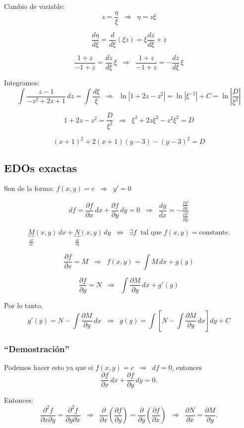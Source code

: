 \documentclass[a4paper,12pt]{article}
\begin{document}
Cambio de variable:
\[
z = \frac{\eta}{\xi} \;\;\Rightarrow\;\; \eta = z\xi
\]

\[
\frac{d\eta}{d\xi} = \frac{d}{d\xi}(\xi z) = \xi \frac{dz}{d\xi} + z
\]

\[
\frac{1+z}{-1+z} = \frac{dz}{d\xi}\,\xi
\;\;\Rightarrow\;\;
\frac{1+z}{-1+z} = -\frac{dz}{d\xi}\,\xi
\]

Integramos:
\[
\int \frac{z-1}{-z^2+2z+1}\,dz = \int \frac{d\xi}{\xi}
\;\;\Rightarrow\;\;
\ln|1+2z-z^2| = \ln|\xi^{-2}| + C = \ln\left|\frac{D}{\xi^2}\right|
\]

\[
1+2z-z^2 = \frac{D}{\xi^2}
\;\;\Rightarrow\;\;
\xi^2 + 2z\xi^2 - z^2\xi^2 = D
\]

\[
(x+1)^2 + 2(x+1)(y-3) - (y-3)^2 = D
\]

\subsection{EDOs exactas}

Son de la forma: $f(x,y)=c \;\;\Rightarrow\;\; y'=0$

\[
df = \frac{\partial f}{\partial x}\,dx + \frac{\partial f}{\partial y}\,dy = 0
\;\;\Rightarrow\;\;
\frac{dy}{dx} = -\frac{\frac{\partial f}{\partial x}}{\frac{\partial f}{\partial y}}
\]

\[
\underbrace{M}_{\frac{\partial f}{\partial x}}(x,y)\,dx + 
\underbrace{N}_{\frac{\partial f}{\partial y}}(x,y)\,dy
\;\;\Leftrightarrow\;\; 
\exists f \;\; \text{tal que } f(x,y)=\text{constante}.
\]

\[
\frac{\partial f}{\partial x}=M \;\;\Rightarrow\;\; 
f(x,y) = \int M\,dx + g(y)
\]

\[
\frac{\partial f}{\partial y}=N \;\;\Rightarrow\;\;
\int \frac{\partial M}{\partial y}\,dx + g'(y)
\]

Por lo tanto,
\[
g'(y) = N - \int \frac{\partial M}{\partial y}\,dx 
\;\;\Rightarrow\;\;
g(y) = \int\left[N - \int \frac{\partial M}{\partial y}\,dx\right]dy + C
\]

\subsubsection*{“Demostración”}

Podemos hacer esto ya que si $f(x,y)=c \;\;\Rightarrow\;\; df=0$,  
entonces
\[
\frac{\partial f}{\partial x}\,dx + \frac{\partial f}{\partial y}\,dy = 0.
\]

Entonces:
\[
\frac{\partial^2 f}{\partial x \partial y} = \frac{\partial^2 f}{\partial y \partial x}
\;\;\Rightarrow\;\;
\frac{\partial}{\partial x}\!\left(\frac{\partial f}{\partial y}\right)
= \frac{\partial}{\partial y}\!\left(\frac{\partial f}{\partial x}\right)
\;\;\Rightarrow\;\;
\frac{\partial N}{\partial x} = \frac{\partial M}{\partial y}.
\]
\end{document}
